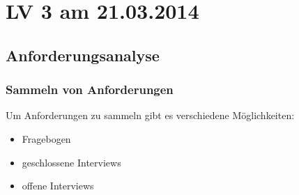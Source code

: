 \chapter{LV 3 am 21.03.2014}
\section{Anforderungsanalyse}
\subsection{Sammeln von Anforderungen}
Um Anforderungen zu sammeln gibt es verschiedene Möglichkeiten:
\begin{itemize}
\item Fragebogen
\item geschlossene Interviews
\item offene Interviews
\end{itemize}

